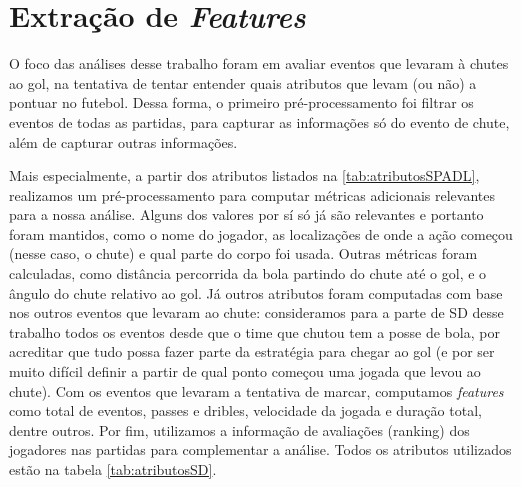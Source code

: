 \documentclass{article}
\begin{document}
\section{Extração de \textit{Features}}

O foco das análises desse trabalho foram em avaliar eventos que levaram à 
chutes ao gol, na tentativa de tentar entender quais atributos que levam 
(ou não) a pontuar no futebol. Dessa forma, o primeiro pré-processamento foi 
filtrar os eventos de todas as partidas, para capturar as informações só
do evento de chute, além de capturar outras informações.

Mais especialmente, a partir dos atributos listados na \ref{tab:atributosSPADL}, 
realizamos um  pré-processamento para computar métricas adicionais relevantes 
para a nossa análise. Alguns dos valores por sí só já são relevantes e portanto 
foram mantidos, como o nome do jogador, as localizações de onde a ação 
começou (nesse caso, o chute) e qual parte do corpo foi usada. Outras métricas 
foram calculadas, como distância percorrida da bola partindo do chute até o gol, 
e o ângulo do chute relativo ao gol. Já outros atributos foram computadas com base 
nos outros eventos que levaram ao chute: consideramos para a parte de SD desse 
trabalho todos os eventos desde que o time que chutou tem a posse de bola, por 
acreditar que tudo possa fazer parte da estratégia para chegar ao gol (e por ser 
muito difícil definir a partir de qual ponto começou uma jogada que levou ao chute).
Com os eventos que levaram a tentativa de marcar, computamos \textit{features} como 
total de eventos, passes e dribles, velocidade da jogada e duração total, dentre 
outros. Por fim, utilizamos a informação de avaliações (ranking) dos jogadores 
nas partidas para complementar a análise. Todos os atributos utilizados estão 
na tabela \ref{tab:atributosSD}.
\end{document}
